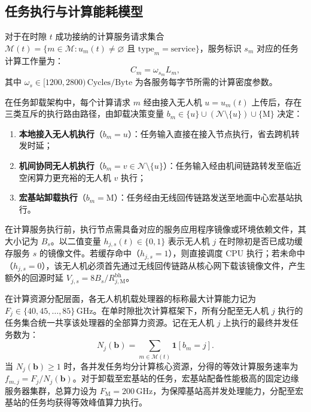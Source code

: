 \subsection{任务执行与计算能耗模型}
\label{sec:ch3-service-paths}
\label{sec:ch3-energy-accounting}
\label{sec:ch3-cache-dynamics}
\label{sec:ch3-battery-motion}

对于在时隙 $t$ 成功接纳的计算服务请求集合 $\mathcal M(t) = \{m \in \mathcal M: u_m(t) \neq \varnothing \text{ 且 } \text{type}_m = \text{service}\}$，服务标识 $s_m$ 对应的任务计算工作量为：
\begin{equation}
    C_m = \omega_{s_m} L_m,
    \label{eq:ch3-cpu-cycles}
\end{equation}
其中 $\omega_s \in [1200, 2800)\,\text{Cycles/Byte}$ 为各服务每字节所需的计算密度参数。

在任务卸载架构中，每个计算请求 $m$ 经由接入无人机 $u = u_m(t)$ 上传后，存在三类互斥的执行路由路径，由卸载决策变量 $b_m \in \{u\} \cup (\mathcal N \setminus \{u\}) \cup \{\mathrm M\}$ 决定：
\begin{enumerate}
    \item \textbf{本地接入无人机执行}（$b_m = u$）：任务输入直接在接入节点执行，省去跨机转发时延；
    \item \textbf{机间协同无人机执行}（$b_m = v \in \mathcal N \setminus \{u\}$）：任务输入经由机间链路转发至临近空闲算力更充裕的无人机 $v$ 执行；
    \item \textbf{宏基站卸载执行}（$b_m = \mathrm M$）：任务经由无线回传链路发送至地面中心宏基站执行。
\end{enumerate}

在计算服务执行前，执行节点需具备对应的服务应用程序镜像或环境依赖文件，其大小记为 $B_s$。以二值变量 $h_{j,s}(t) \in \{0, 1\}$ 表示无人机 $j$ 在时隙初是否已成功缓存服务 $s$ 的镜像文件。若缓存命中（$h_{j,s}=1$），则直接调度 CPU 执行；若未命中（$h_{j,s}=0$），该无人机必须首先通过无线回传链路从核心网下载该镜像文件，产生额外的回源时延 $V_{j,s} = 8B_s / R^{\mathrm{bh}}_{j,\mathrm M}$。

在计算资源分配层面，各无人机机载处理器的标称最大计算能力记为 $F_j \in \{40, 45, \dots, 85\}\,\mathrm{GHz}$。在单时隙批次计算框架下，所有分配至无人机 $j$ 执行的任务集合统一共享该处理器的全部算力资源。记在无人机 $j$ 上执行的最终并发任务数为：
\begin{equation}
    N_j(\mathbf b) = \sum_{m\in\mathcal M(t)} \mathbf 1[b_m = j].
    \label{eq:ch3-final-load}
\end{equation}
当 $N_j(\mathbf b) \geq 1$ 时，各并发任务均分计算核心资源，分得的等效计算服务速率为 $f_{m,j} = F_j / N_j(\mathbf b)$。对于卸载至宏基站的任务，宏基站配备性能极高的固定边缘服务器集群，总算力设为 $F_{\mathrm M} = 200\,\mathrm{GHz}$，为保障基站高并发处理能力，分配至宏基站的任务均获得等效峰值算力执行。

